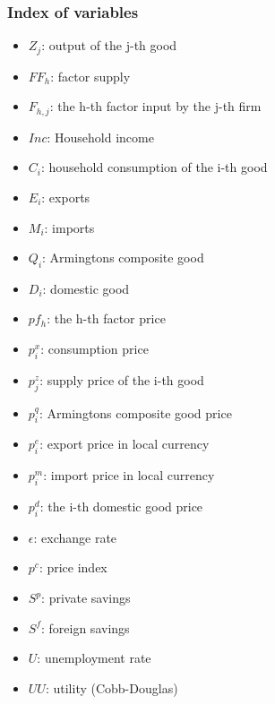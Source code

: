 \subsubsection{Index of variables}
\begin{itemize}
	\item $Z_j$: output of the j-th good
	\item $FF_h$: factor supply
	\item $F_{h,j}$: the h-th factor input by the j-th firm
	\item $Inc$: Household income
	\item $C_i$: household consumption of the i-th good
	\item $E_i$:  exports
	\item $M_i$:  imports
	\item $Q_i$:  Armingtons composite good
	\item $D_i$:  domestic good

	\item $pf_h$: the h-th factor price
	\item $p^x_i$: consumption price
	\item $p^z_j$: supply price of the i-th good
	\item $p^q_i$: Armingtons composite good price
	\item $p^e_i$: export price in local currency
	\item $p^m_i$: import price in local currency
	\item $p^d_i$: the i-th domestic good price
	\item $\epsilon$: exchange rate
	\item $p^c$: price index

	\item $S^p$: private savings
	\item $S^f$: foreign savings
	\item $U$: unemployment rate
	\item $UU$: utility (Cobb-Douglas)
\end{itemize}

